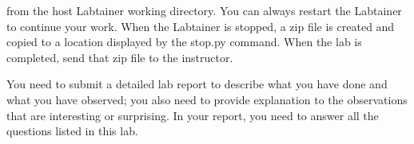 from the host Labtainer working directory.  You can always restart the
Labtainer to continue your work.  When the Labtainer is stopped, a
zip file is created and copied to a location displayed by the stop.py
command.  When the lab is completed, send that zip file to the instructor.

You need to submit a detailed lab report to describe what you have
done and what you have observed; you also need to provide explanation
to the observations that are interesting or surprising. In your report,
you need to answer all the questions listed in this lab.







